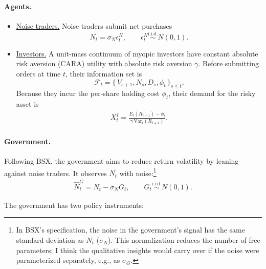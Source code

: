\documentclass[12pt]{article}
\begin{document}
\paragraph{Agents.}

\begin{itemize}
\item \underline{Noise traders.}
Noise traders submit net purchases
\[
N_t = \sigma_N \epsilon_t^N, \qquad \epsilon_t^N \stackrel{\text{i.i.d.}}{\sim} N(0,1).
\]

\item \underline{Investors.}
A unit‑mass continuum of myopic investors have constant absolute risk aversion (CARA) utility with absolute risk aversion \(\gamma\). Before submitting orders at time $t$, their information set is  
\[
\mathcal{F}_t = \{\, V_{s+1}, N_s, D_s, \phi_t \,\}_{s \le t}.
\]  
Because they incur the per‑share holding cost \(\phi_t\), their demand for the risky asset is
\begin{align}
    X_t^I = \frac{E_t(R_{t+1}) - \phi_t}{\gamma \,\mathrm{Var}_t(R_{t+1})}. \label{demand_with_phi}
\end{align}
\end{itemize}

\paragraph{Government.}
Following BSX, the government aims to reduce return volatility by leaning against noise traders. It observes \(N_t\) with noise:\footnote{In BSX's specification, the noise in the government's signal has the same standard deviation as \(N_t\) (\(\sigma_N\)). This normalization reduces the number of free parameters; I think the qualitative insights would carry over if the noise were parameterized separately, e.g., as \(\sigma_G\).}
\begin{align}
    \hat{N}_t^G = N_t - \sigma_N G_t, \qquad G_t \stackrel{\text{i.i.d.}}{\sim} N(0,1). \label{govt_noisy_signal}
\end{align}


The government has two policy instruments:
\end{document}
